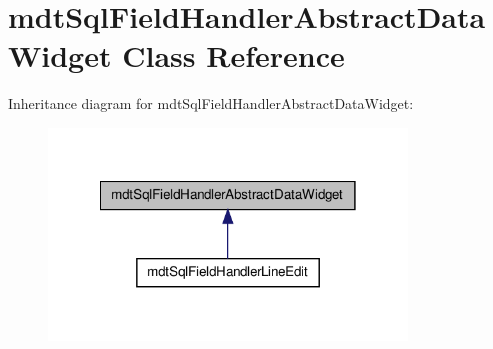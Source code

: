 \hypertarget{classmdt_sql_field_handler_abstract_data_widget}{
\section{mdtSqlFieldHandlerAbstractDataWidget Class Reference}
\label{classmdt_sql_field_handler_abstract_data_widget}
}


Inheritance diagram for mdtSqlFieldHandlerAbstractDataWidget:
\nopagebreak
\begin{figure}[H]
\begin{center}
\leavevmode
\includegraphics[width=270pt]{classmdt_sql_field_handler_abstract_data_widget__inherit__graph}
\end{center}
\end{figure}

